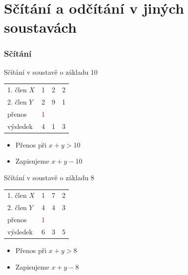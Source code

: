 \section{\texorpdfstring{Sčítání a odčítání v jiných soustavách}{Scitani a odcitani v jinych soustavach}}

	\begin{frame}
    \frametitle{Sčítání}

		\begin{minipage}[t][\textheight][t]{0.49\textwidth}
      Sčítání v soustavě o základu 10
      \vspace{10mm}
      
			\boldmath
			\begin{tabular}{ p{20mm} c c c}
				1. člen $X$  & 1 & 2 & 2 \\
				2. člen $Y$  & 2 & 9 & 1 \\
        přenos    & \textcolor{red}{1} &   &   \\
        \hline
        výsledek  & 4 & 1 & 3 \\
			\end{tabular}
      
      \vspace{10mm}
      \begin{itemize}
        \item Přenos při $x + y > 10$
        \item Zapisujeme $x + y - 10$
      \end{itemize}
      
		\end{minipage}
		\begin{minipage}[t][\textheight][t]{0.5\textwidth}
      Sčítání v soustavě o základu 8
      \vspace{10mm}
      
			\boldmath
			\begin{tabular}{ p{20mm} c c c}
				1. člen $X$  & 1 & 7 & 2 \\
				2. člen $Y$  & 4 & 4 & 3 \\
        přenos    & \textcolor{red}{1} &   &   \\
        \hline
        výsledek  & 6 & 3 & 5 \\
			\end{tabular}
      
      \vspace{10mm}
      \begin{itemize}
        \item Přenos při $x + y > 8$
        \item Zapisujeme $x + y - 8$
      \end{itemize}
      
		\end{minipage}
		
	\end{frame}

